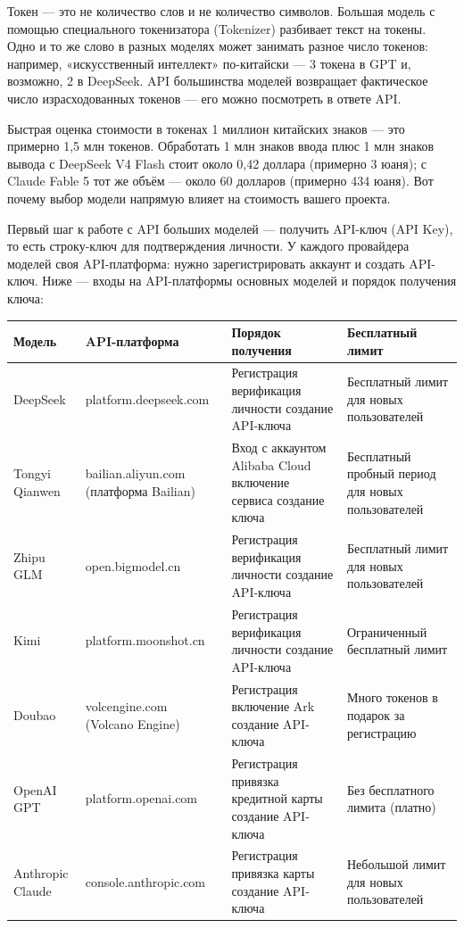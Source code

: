 Токен — это не количество слов и не количество символов. Большая модель с помощью специального токенизатора (Tokenizer) разбивает текст на токены. Одно и то же слово в разных моделях может занимать разное число токенов: например, «искусственный интеллект» по-китайски — 3 токена в GPT и, возможно, 2 в DeepSeek. API большинства моделей возвращает фактическое число израсходованных токенов — его можно посмотреть в ответе API.

\begin{tcbinfo}{Быстрая оценка стоимости в токенах}
1 миллион китайских знаков — это примерно 1,5 млн токенов. Обработать 1 млн знаков ввода плюс 1 млн знаков вывода с DeepSeek V4 Flash стоит около 0,42 доллара (примерно 3 юаня); с Claude Fable 5 тот же объём — около 60 долларов (примерно 434 юаня). Вот почему выбор модели напрямую влияет на стоимость вашего проекта.

\end{tcbinfo}


Первый шаг к работе с API больших моделей — получить API-ключ (API Key), то есть строку-ключ для подтверждения личности. У каждого провайдера моделей своя API-платформа: нужно зарегистрировать аккаунт и создать API-ключ. Ниже — входы на API-платформы основных моделей и порядок получения ключа:

\begin{center}
\begin{tabularx}{\linewidth}{|X|X|X|X|}
\hline
\textbf{Модель} & \textbf{API-платформа} & \textbf{Порядок получения} & \textbf{Бесплатный лимит} \tabularnewline
\hline
DeepSeek & platform.deepseek.com & Регистрация верификация личности создание API-ключа & Бесплатный лимит для новых пользователей \tabularnewline
Tongyi Qianwen & bailian.aliyun.com (платформа Bailian) & Вход с аккаунтом Alibaba Cloud включение сервиса создание ключа & Бесплатный пробный период для новых пользователей \tabularnewline
Zhipu GLM & open.bigmodel.cn & Регистрация верификация личности создание API-ключа & Бесплатный лимит для новых пользователей \tabularnewline
Kimi & platform.moonshot.cn & Регистрация верификация личности создание API-ключа & Ограниченный бесплатный лимит \tabularnewline
Doubao & volcengine.com (Volcano Engine) & Регистрация включение Ark создание API-ключа & Много токенов в подарок за регистрацию \tabularnewline
OpenAI GPT & platform.openai.com & Регистрация привязка кредитной карты создание API-ключа & Без бесплатного лимита (платно) \tabularnewline
Anthropic Claude & console.anthropic.com & Регистрация привязка карты создание API-ключа & Небольшой лимит для новых пользователей \tabularnewline
\hline
\end{tabularx}
\end{center}

